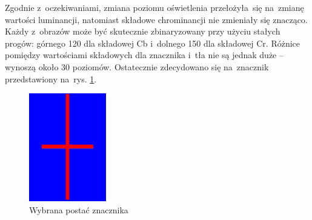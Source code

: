 Zgodnie z~oczekiwaniami, zmiana poziomu oświetlenia przełożyła~się na~zmianę wartości luminancji, natomiast składowe chrominancji nie zmieniały się znacząco. 
Każdy z~obrazów może być skutecznie zbinaryzowany przy użyciu stałych progów: górnego 120 dla składowej Cb i~dolnego 150 dla składowej Cr. 
Różnice pomiędzy wartościami składowych dla znacznika i~tła nie są jednak duże -- wynoszą około 30 poziomów. 
Ostatecznie zdecydowano się na~znacznik przedstawiony na~rys. \ref{fig:znacznik}.
\begin{figure}[h]
	\centering
	\includegraphics[width=0.3\textwidth]{znacznik.jpg}
	\caption{Wybrana postać znacznika}
	\label{fig:znacznik}
\end{figure}




